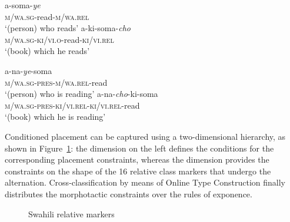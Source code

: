 \documentclass[output=paper
	        ,collection
	        ,collectionchapter
 	        ,biblatex
                ,babelshorthands
                ,newtxmath
                ,draftmode
                ,colorlinks, citecolor=brown
]{langscibook}
\begin{document}
\begin{exe}
\begin{xlist}
\begin{exe}
\begin{xlist}
\begin{exe}
  \ex\label{ex:SwahiliRel:suff}
  \begin{xlist}
    \ex\gll  a-soma-\textit{ye}\\
    \textsc{m/wa.sg}-read\textsc{-m/wa.rel}\\
    \glt ‘(person) who reads’
    \ex\gll a-ki-soma-\textit{cho}\\
    \textsc{m/wa.sg}-\textsc{ki/vi.o}-read-\textsc{ki/vi.rel}\\
    \glt ‘(book) which he reads’
  \end{xlist}
  \ex\label{ex:SwahiliRel:pref}
  \begin{xlist}
    \ex\gll  a-na-\textit{ye}-soma\\
    \textsc{m/wa.sg-pres-m/wa.rel}-read\\
    \glt ‘(person) who is reading’
    \ex\gll a-na-\textit{cho}-ki-soma\\
    \textsc{m/wa.sg-pres-ki/vi.rel-ki/vi.rel}-read\\
    \glt ‘(book) which he is reading’
  \end{xlist}
\end{exe}

Conditioned placement can be captured using a two-dimensional
hierarchy, as shown in Figure~\ref{fig:SwahiliRel}: the
 dimension on the left defines the conditions for
the corresponding placement constraints, whereas the 
dimension provides the constraints on the shape of the 16 relative
class markers that undergo the alternation.  Cross-classification by
means of Online Type Construction finally distributes the morphotactic
constraints over the rules of exponence.
  

\begin{figure}[htb]
  \centering
  
\caption{Swahili relative markers}\label{fig:SwahiliRel}
\end{figure}



\end{xlist}
\end{exe}
\end{xlist}
\end{exe}
\end{document}
